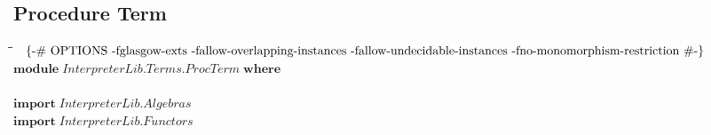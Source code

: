\documentclass[10pt]{article}
\newlength{\lwidth}\setlength{\lwidth}{4.5cm}
\newlength{\cwidth}\setlength{\cwidth}{8mm} %
\newcommand{\Conid}[1]{\mathit{#1}}
\begin{document}
\subsection{Procedure Term}
\begin{tabbing}
\qquad\=\hspace{\lwidth}\=\hspace{\cwidth}\=\+\kill
${\mbox{\enskip\{-\# OPTIONS -fglasgow-exts -fallow-overlapping-instances -fallow-undecidable-instances -fno-monomorphism-restriction  \#-\}\enskip}}$\\
${\mathbf{module}\;\Conid{\Conid{InterpreterLib}.\Conid{Terms}.ProcTerm}\;\mathbf{where}}$\\
${}$\\
${\mathbf{import}\;\Conid{\Conid{InterpreterLib}.Algebras}}$\\
${\mathbf{import}\;\Conid{\Conid{InterpreterLib}.Functors}}$
\end{tabbing}
\end{document}
